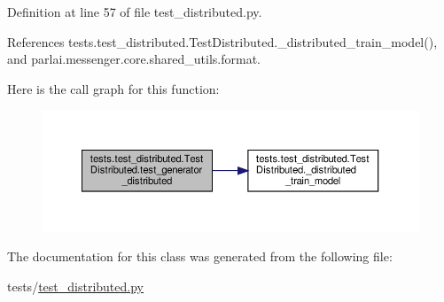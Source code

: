 Definition at line 57 of file test\+\_\+distributed.\+py.



References tests.\+test\+\_\+distributed.\+Test\+Distributed.\+\_\+distributed\+\_\+train\+\_\+model(), and parlai.\+messenger.\+core.\+shared\+\_\+utils.\+format.

Here is the call graph for this function\+:
\nopagebreak
\begin{figure}[H]
\begin{center}
\leavevmode
\includegraphics[width=350pt]{classtests_1_1test__distributed_1_1TestDistributed_ab483f9fbc8ee190aa9999994a211d0fe_cgraph}
\end{center}
\end{figure}


The documentation for this class was generated from the following file\+:\begin{DoxyCompactItemize}
\item 
tests/\hyperlink{test__distributed_8py}{test\+\_\+distributed.\+py}\end{DoxyCompactItemize}

